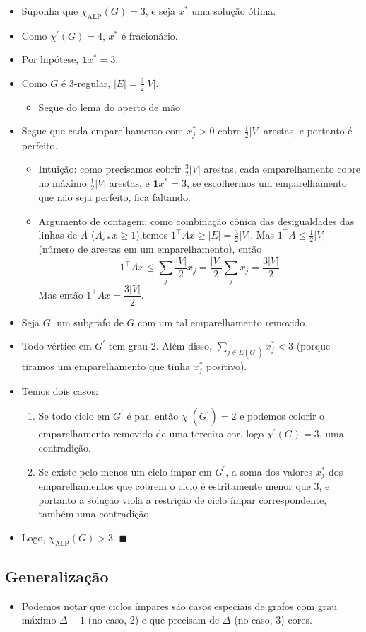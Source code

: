 \documentclass[12pt]{article}
\begin{document}
    \begin{itemize}
        \item Suponha que $\chi_\mathrm{ALP}(G) = 3$, e seja $x^*$ uma solução ótima.
        \item Como $\chi^\prime(G) = 4$, $x^*$ é fracionário.
        \item Por hipótese, $\mathbf{1} x^* = 3$.
        \item
            Como $G$ é 3-regular, $|E| = \frac{3}{2}|V|$.
            \begin{itemize}
                \item Segue do lema do aperto de mão
            \end{itemize}
        \item Segue que cada emparelhamento com $x^*_j > 0$ cobre $\frac{1}{2}|V|$ arestas, e portanto é perfeito.
        \begin{itemize}
            \item Intuição: como precisamos cobrir $\frac{3}{2}|V|$ arestas, cada emparelhamento cobre no máximo $\frac{1}{2}|V|$ arestas, e $\mathbf{1} x^* = 3$, se escolhermos um emparelhamento que não seja perfeito, fica faltando.
            \item Argumento de contagem: como combinação cônica das desigualdades das linhas de $A$ ($A_{e*} x \geq 1$),temos $1^\top A x \geq |E| = \frac{3}{2}|V|$. Mas $1^\top A \leq \frac{1}{2}|V|$ (número de arestas em um emparelhamento), então $$1^\top A x \leq \sum_j \dfrac{|V|}{2} x_j = \dfrac{|V|}{2} \sum_j x_j = \dfrac{3|V|}{2}$$
            Mas então $1^\top A x = \dfrac{3|V|}{2}$.
        \end{itemize}
        \item Seja $G^\prime$ um subgrafo de $G$ com um tal emparelhamento removido.
        \item Todo vértice em $G^\prime$ tem grau 2. Além disso, $\sum_{j \in E(G^\prime)} x^*_j < 3$ (porque tiramos um emparelhamento que tinha $x^*_j$ positivo).
        \item Temos dois casos:
        \begin{enumerate}
            \item Se todo ciclo em $G^\prime$ é par, então $\chi^\prime(G^\prime) = 2$ e podemos colorir o emparelhamento removido de uma terceira cor, logo $\chi^\prime(G) = 3$, uma contradição.
            \item Se existe pelo menos um ciclo ímpar em $G^\prime$, a soma dos valores $x^*_j$ dos emparelhamentos que cobrem o ciclo é estritamente menor que 3, e portanto a solução viola a restrição de ciclo ímpar correspondente, também uma contradição.
        \end{enumerate}
        \item Logo, $\chi_\mathrm{ALP}(G) > 3$. $\blacksquare$
    \end{itemize}


    \subsection*{Generalização}
    \begin{itemize}
        \item Podemos notar que ciclos ímpares são casos especiais de grafos com grau máximo $\Delta - 1$ (no caso, 2) e que precisam de $\Delta$ (no caso, 3) cores.
    \end{itemize}
\end{document}

